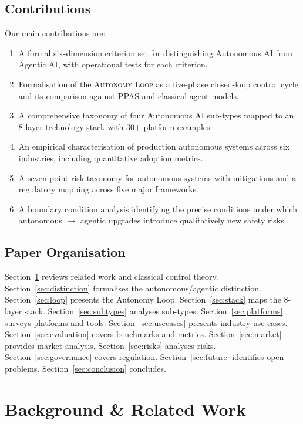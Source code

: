 \documentclass[12pt, a4paper]{article}
\begin{document}
\subsection{Contributions}
Our main contributions are:
\begin{enumerate}
    \item A formal six-dimension criterion set for distinguishing Autonomous AI from Agentic AI, with operational tests for each criterion.
    \item Formalisation of the \textsc{Autonomy Loop} as a five-phase closed-loop control cycle and its comparison against PPAS and classical agent models.
    \item A comprehensive taxonomy of four Autonomous AI sub-types mapped to an 8-layer technology stack with 30+ platform examples.
    \item An empirical characterisation of production autonomous systems across six industries, including quantitative adoption metrics.
    \item A seven-point risk taxonomy for autonomous systems with mitigations and a regulatory mapping across five major frameworks.
    \item A boundary condition analysis identifying the precise conditions under which autonomous $\to$ agentic upgrades introduce qualitatively new safety risks.
\end{enumerate}

\subsection{Paper Organisation}
Section~\ref{sec:background} reviews related work and classical control theory. Section~\ref{sec:distinction} formalises the autonomous/agentic distinction. Section~\ref{sec:loop} presents the Autonomy Loop. Section~\ref{sec:stack} maps the 8-layer stack. Section~\ref{sec:subtypes} analyses sub-types. Section~\ref{sec:platforms} surveys platforms and tools. Section~\ref{sec:usecases} presents industry use cases. Section~\ref{sec:evaluation} covers benchmarks and metrics. Section~\ref{sec:market} provides market analysis. Section~\ref{sec:risks} analyses risks. Section~\ref{sec:governance} covers regulation. Section~\ref{sec:future} identifies open problems. Section~\ref{sec:conclusion} concludes.

\section{Background \& Related Work}\label{sec:background}
\end{document}
